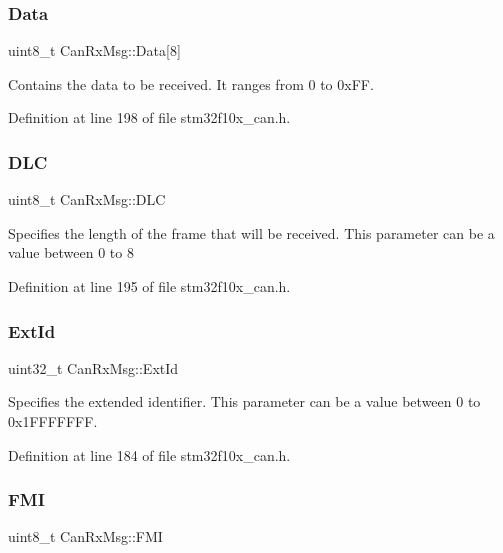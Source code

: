 \subsubsection{\texorpdfstring{Data}{Data}}
{\footnotesize\ttfamily uint8\+\_\+t Can\+Rx\+Msg\+::\+Data\mbox{[}8\mbox{]}}

Contains the data to be received. It ranges from 0 to 0x\+FF. 

Definition at line 198 of file stm32f10x\+\_\+can.\+h.

\mbox{\label{struct_can_rx_msg_abf77d3abf9ad290c08cdfd5d99ebc745}} 
\subsubsection{\texorpdfstring{D\+LC}{DLC}}
{\footnotesize\ttfamily uint8\+\_\+t Can\+Rx\+Msg\+::\+D\+LC}

Specifies the length of the frame that will be received. This parameter can be a value between 0 to 8 

Definition at line 195 of file stm32f10x\+\_\+can.\+h.

\mbox{\label{struct_can_rx_msg_a1fdca10d31c81eea2ccef41d2aced562}} 
\subsubsection{\texorpdfstring{Ext\+Id}{ExtId}}
{\footnotesize\ttfamily uint32\+\_\+t Can\+Rx\+Msg\+::\+Ext\+Id}

Specifies the extended identifier. This parameter can be a value between 0 to 0x1\+F\+F\+F\+F\+F\+FF. 

Definition at line 184 of file stm32f10x\+\_\+can.\+h.

\mbox{\label{struct_can_rx_msg_a5afe39d8e295659eeb3030593828b96a}} 
\subsubsection{\texorpdfstring{F\+MI}{FMI}}
{\footnotesize\ttfamily uint8\+\_\+t Can\+Rx\+Msg\+::\+F\+MI}

